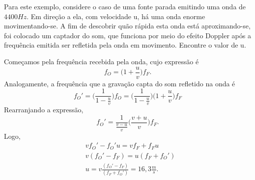\documentclass[PhysicsII/phsyicsII_notes.tex]{subfiles}
\begin{document}
\begin{example}
	Para este exemplo, considere o caso de uma fonte parada emitindo uma onda de \(4400Hz\). Em direção a ela, com velocidade u, há uma onda enorme movimentando-se.
	A fim de descobrir quão rápida esta onda está aproximando-se, foi colocado um captador do som, que funciona por meio do efeito Doppler após a frequência emitida ser refletida
	pela onda em movimento. Encontre o valor de u.

	Começamos pela frequência recebida pela onda, cujo expressão é
	\[
		f_{O} = \biggl(1 + \frac{u}{v}\biggr)f_{F}.
	\]
	Analogamente, a frequência que a gravação capta do som refletido na onda é
	\[
		f_{O}' = \biggl(\frac{1}{1-\frac{u}{v}}\biggr)f_{O} = \biggl(\frac{1}{1-\frac{u}{v}}\biggr)\biggl(1+\frac{u}{v}\biggr)f_{F}
	\]
	Rearranjando a expressão,
	\[
		f_{O}' = \frac{1}{\frac{v-u}{v}}\biggl(\frac{v+u}{v}\biggr)f_{F}.
	\]
	Logo,
	\begin{align*}
		 & vf_{O}' - f_{O}'u = vf_{F} + f_{F}u                            \\
		 & v(f_{O}' - f_{F}) = u(f_{F}+f_{O}')                            \\
		 & u = v\frac{(f_{O}'-f_{F})}{(f_{F}+f_{O}')} = 16,3 \frac{m}{s}.
	\end{align*}
\end{example}
\end{document}
